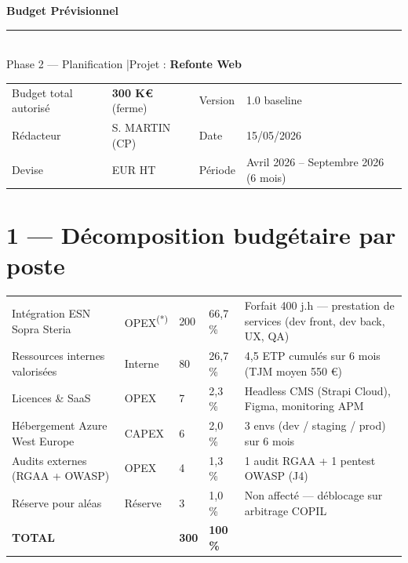 \documentclass[11pt,a4paper,oneside]{report}
\begin{document}
\small

\begin{center}
{\LARGE\bfseries\color{cnNavy} Budget Prévisionnel}\\[4pt]
\textcolor{cnOrange}{\rule{10cm}{1pt}}\\[4pt]
{\large\color{cnSlate} Phase 2 --- Planification \quad|\quad Projet : \textbf{Refonte Web}}
\end{center}

\vspace{6pt}
\renewcommand{\arraystretch}{1.4}
\begin{tabularx}{\textwidth}{L{3.5cm} Y L{3.5cm} Y}
\toprule
{} &  &  &  \\
\midrule
Budget total autorisé & \textbf{300 K€} (ferme)   & Version   & 1.0 baseline \\
Rédacteur             & S. MARTIN (CP)            & Date      & 15/05/2026 \\
Devise                & EUR HT                     & Période   & Avril 2026 -- Septembre 2026 (6 mois) \\
\bottomrule
\end{tabularx}

\section*{1 --- Décomposition budgétaire par poste}

\renewcommand{\arraystretch}{1.4}
\begin{tabularx}{\textwidth}{L{5cm} C{2.5cm} C{2.5cm} C{2cm} Y}
\toprule
{} &  &  &  &  \\
\midrule
Intégration ESN Sopra Steria       & OPEX\textsuperscript{(*)} & 200 & 66{,}7\,\% & Forfait 400 j.h --- prestation de services (dev front, dev back, UX, QA) \\
Ressources internes valorisées     & Interne & 80  & 26{,}7\,\% & 4{,}5 ETP cumulés sur 6 mois (TJM moyen 550 €) \\
Licences \& SaaS                   & OPEX  & 7   & 2{,}3\,\%  & Headless CMS (Strapi Cloud), Figma, monitoring APM \\
Hébergement Azure West Europe      & CAPEX & 6   & 2{,}0\,\%  & 3 envs (dev / staging / prod) sur 6 mois \\
Audits externes (RGAA + OWASP)     & OPEX  & 4   & 1{,}3\,\%  & 1 audit RGAA + 1 pentest OWASP (J4) \\
Réserve pour aléas                 & Réserve & 3 & 1{,}0\,\%  & Non affecté --- déblocage sur arbitrage COPIL \\
\midrule
{}\textbf{TOTAL} & & \textbf{300} & \textbf{100\,\%} & \\
\bottomrule
\end{tabularx}
\end{document}
